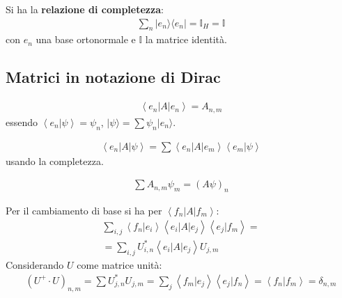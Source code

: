 Si ha la \textbf{relazione di completezza}:
\begin{equation}\begin{split}
\sum_{n}|e_n\rangle\langle e_n|= \mathbb{I}_H=\mathbb{I}
\end{split}\end{equation}
con $e_n$ una base ortonormale e $\mathbb{I}$ la matrice identità.

\subsection{Matrici in notazione di Dirac} %
\begin{equation}\begin{split}
\left\langle e_n|A|e_n \right\rangle=A_{n,m}
\end{split}\end{equation}
essendo $\left\langle e_n|\psi  \right\rangle=\psi _n$, $|\psi \rangle =\sum{\psi _n | e_n \rangle}$.

\begin{equation}\begin{split}
\left\langle e_n|A|\psi  \right\rangle=\sum\left\langle e_n|A|e_m \right\rangle\left\langle e_m|\psi  \right\rangle
\end{split}\end{equation}
usando la completezza.

\begin{equation}\begin{split}
\sum{A_{n,m}\psi _m}=\left(A\psi \right)_n
\end{split}\end{equation}

Per il cambiamento di base si ha per $\left\langle f_n|A|f_m \right\rangle$:
\begin{equation}\begin{split}
\sum_{i,j}{\left\langle f_n|e_i \right\rangle\left\langle e_i|A|e_j \right\rangle\left\langle e_j|f_m \right\rangle}= \\
=\sum_{i,j}{U^*_{i,n}\left\langle e_i|A|e_j \right\rangle U_{j,m}}
\end{split}\end{equation}
Considerando $U$ come matrice unità:
\begin{equation}\begin{split}
\left(U^+\cdot U\right)_{n,m}=\sum{U^*_{j,n}U_{j,m}}=\sum_j\left\langle f_m|e_j \right\rangle\left\langle e_j|f_n \right\rangle=\left\langle f_n|f_m \right\rangle=\delta_{n,m}
\end{split}\end{equation}

